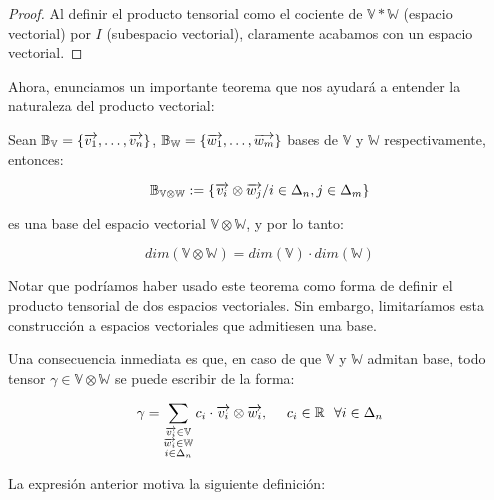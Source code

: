 \begin{proof}
	Al definir el producto tensorial como el cociente de $\mathbb{V} \ast \mathbb{W}$ (espacio vectorial) por $I$ (subespacio vectorial), claramente acabamos con un espacio vectorial.
\end{proof}


Ahora, enunciamos un importante teorema que nos ayudará a entender la naturaleza del producto vectorial:

\begin{teorema} \label{th:base_prod_tensorial}
	Sean $\mathbb{B}_{\mathbb{V}} = \{\overrightarrow{v_1}, \ldots, \overrightarrow{v_n}\}$, $\mathbb{B}_{\mathbb{W}} = \{\overrightarrow{w_1}, \ldots, \overrightarrow{w_m}\}$ bases de $\mathbb{V}$ y  $\mathbb{W}$ respectivamente, entonces:

	\begin{equation}
		\mathbb{B}_{\mathbb{V} \otimes \mathbb{W}} := \{\overrightarrow{v_i} \otimes \overrightarrow{w_j} / i \in \Delta_{n}, j \in \Delta_{m}\}
	\end{equation}


	es una base del espacio vectorial $\mathbb{V} \otimes \mathbb{W}$, y por lo tanto:

	\begin{equation}
		dim(\mathbb{V} \otimes \mathbb{W}) = dim(\mathbb{V}) \cdot dim(\mathbb{W})
	\end{equation}

\end{teorema}

\begin{observacion}
	Notar que podríamos haber usado este teorema como forma de definir el producto tensorial de dos espacios vectoriales. Sin embargo, limitaríamos esta construcción a espacios vectoriales que admitiesen una base.
\end{observacion}

Una consecuencia inmediata es que, en caso de que $\mathbb{V}$ y $\mathbb{W}$ admitan base, todo tensor $\gamma \in \mathbb{V} \otimes \mathbb{W}$ se puede escribir de la forma:

\begin{equation}
	\gamma = \sum_{\substack{\overrightarrow{v_i} \in \mathbb{V}\\ \overrightarrow{w_i} \in \mathbb{W}\\ i \in \Delta_{n}}} c_{i} \cdot \overrightarrow{v_i} \otimes \overrightarrow{w_i}, \ \ \ \  c_i \in \mathbb{R} \ \  \forall i \in \Delta_{n}
\end{equation}

La expresión anterior motiva la siguiente definición:

